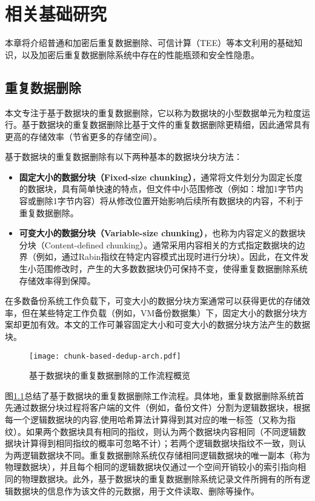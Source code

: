 \chapter{相关基础研究}
\label{chapter:background}

本章将介绍普通和加密后重复数据删除、可信计算（TEE）等本文利用的基础知识，以及加密后重复数据删除系统中存在的性能瓶颈和安全性隐患。

\section{重复数据删除}
\label{sec:background-deduplication}

本文专注于基于数据块的重复数据删除，它以称为数据块的小型数据单元为粒度运行。基于数据块的重复数据删除比基于文件的重复数据删除更精细，因此通常具有更高的存储效率（节省更多的存储空间）。

基于数据块的重复数据删除有以下两种基本的数据块分块方法：

\begin{itemize}[leftmargin=*]
    \item \textbf{固定大小的数据分块（Fixed-size chunking）}，通常将文件划分为固定长度的数据块，具有简单快速的特点，但文件中小范围修改（例如：增加1字节内容或删除1字节内容）将从修改位置开始影响后续所有数据块的内容，不利于重复数据删除。
    \item \textbf{可变大小的数据分块（Variable-size chunking）}，也称为内容定义的数据块分块（Content-defined chunking）。通常采用内容相关的方式指定数据块的边界（例如，通过Rabin指纹\cite{rabin1981fingerprinting}在特定内容模式出现时进行分块）。因此，在文件发生小范围修改时，产生的大多数数据块仍可保持不变，使得重复数据删除系统存储效率得到保障。
\end{itemize}

在多数备份系统工作负载\cite{zhu2008avoiding,lillibridge2009sparse}下，可变大小的数据分块方案通常可以获得更优的存储效率，但在某些特定工作负载（例如，VM备份数据集\cite{jin2009effectiveness}）下，固定大小的数据分块方案却更加有效。本文的工作可兼容固定大小和可变大小的数据分块方法产生的数据块。

\begin{figure}[!htb]
    \small
    \centering
    \texttt{[image: chunk-based-dedup-arch.pdf]}
    \caption{基于数据块的重复数据删除的工作流程概览} 
    \label{fig:chunk-based-dedup-flow}
\end{figure}

图\ref{fig:chunk-based-dedup-flow}总结了基于数据块的重复数据删除工作流程。具体地，重复数据删除系统首先通过数据分块过程将客户端的文件（例如，备份文件）分割为逻辑数据块，根据每一个逻辑数据块的内容,使用哈希算法计算得到其对应的唯一标签（又称为指纹）。如果两个数据块具有相同的指纹，则认为两个数据块内容相同（不同逻辑数据块计算得到相同指纹的概率可忽略不计\cite{black2006compare}）；若两个逻辑数据块指纹不一致，则认为两逻辑数据块不同。重复数据删除系统仅存储相同逻辑数据块的唯一副本（称为物理数据块），并且每个相同的逻辑数据块仅通过一个空间开销较小的索引指向相同的物理数据块。此外，基于数据块的重复数据删除系统记录文件所拥有的所有逻辑数据块的信息作为该文件的元数据，用于文件读取、删除等操作。


